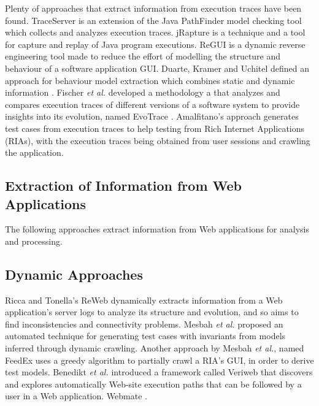 Plenty of approaches that extract information from execution traces have been found. TraceServer \cite{andjelkovic2011trace} is an extension of the Java PathFinder model checking tool \cite{jpf} which collects and analyzes execution traces. jRapture \cite{steven2000jrapture} is a technique and a tool for capture and replay of Java program executions. ReGUI \cite{coimbra2011reverse,coimbra2012dynamic} is a dynamic reverse engineering tool made to reduce the effort of modelling the structure and behaviour of a software application GUI. Duarte, Kramer and Uchitel defined an approach for behaviour model extraction which combines static and dynamic information \cite{duarte2006model}. Fischer \textit{et al.} developed a methodology a that analyzes and compares execution traces of different versions of a software system to provide insights into its evolution, named EvoTrace \cite{fischer2005system}. Amalfitano's approach \cite{amalfitano2010rich} generates test cases from execution traces to help testing from Rich Internet Applications (RIAs), with the execution traces being obtained from user sessions and crawling the application. 


\subsection{Extraction of Information from Web Applications}
The following approaches extract information from Web applications for analysis and processing. 

\subsection{Dynamic Approaches}
Ricca and Tonella's ReWeb \cite{ricca2001understanding} dynamically extracts information from a Web application's server logs to analyze its structure and evolution, and so aims to find inconsistencies and connectivity problems. Mesbah \textit{et al.} proposed \cite{mesbah2012invariant} an automated technique for generating test cases with invariants from models inferred through dynamic crawling. Another approach by Mesbah \textit{et al.}, named FeedEx \cite{fard2013feedback} uses a greedy algorithm to partially crawl a RIA's GUI, in order to derive test models. Benedikt \textit{et al.} introduced a framework called Veriweb \cite{benedikt02veriweb} that discovers and explores automatically Web-site execution paths that can be followed by a user in a Web application. 
Webmate \cite{dallmeier2012webmate}.
